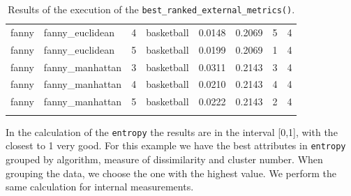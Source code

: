 \begin{itemize}
{\begin{longtable}{| p{1cm} | p{1.8cm} | p{0.9cm} | p{1.1cm} | p{1.6cm} | p{0.8cm} | p{1.8cm} | p{1.5cm} |}
\scriptsize fanny      & \scriptsize fanny\_euclidean & \scriptsize     4     & \scriptsize basketball  & \scriptsize     0.0148    & \scriptsize 0.2069 &  \scriptsize        5        & \scriptsize      4 \\
\scriptsize fanny      & \scriptsize fanny\_euclidean & \scriptsize     5     & \scriptsize basketball  & \scriptsize     0.0199    & \scriptsize 0.2069 &  \scriptsize        1        & \scriptsize      4 \\
\cline{2-8}
\scriptsize fanny      & \scriptsize fanny\_manhattan & \scriptsize     3     & \scriptsize basketball  & \scriptsize     0.0311    & \scriptsize 0.2143 &  \scriptsize        3        & \scriptsize      4 \\
\scriptsize fanny      & \scriptsize fanny\_manhattan & \scriptsize     4     & \scriptsize basketball  & \scriptsize     0.0210    & \scriptsize 0.2143 &  \scriptsize        4        & \scriptsize      4 \\
\scriptsize fanny      & \scriptsize fanny\_manhattan & \scriptsize     5     & \scriptsize basketball  & \scriptsize     0.0222    & \scriptsize 0.2143 &  \scriptsize        2        & \scriptsize      4 \\
\hline
\caption{Results of the execution of the \texttt{best\_ranked\_external\_metrics()}.}
\label{tab:clusteringbestrankedexternalmetrics}
\end{longtable}}

In the calculation of the \texttt{entropy} the results are in the interval [0,1], with the closest to 1 very good. For this example we have the best attributes in \texttt{entropy} grouped by algorithm, measure of dissimilarity and cluster number. When grouping the data, we choose the one with the highest value. We perform the same calculation for internal measurements.


\end{itemize}

